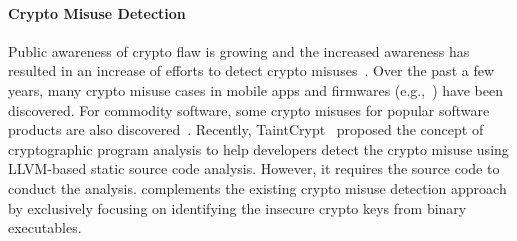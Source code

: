 \paragraph{Crypto Misuse Detection} 
Public awareness of crypto flaw is growing and the increased awareness has resulted in an increase of efforts to detect crypto misuses~\cite{lazar2014does, duong2011cryptography, li2014icryptotracer}. 
Over the past a few years, many crypto misuse cases in mobile apps and firmwares (e.g.,~\cite{egele2013empirical, costin2014large}) have been discovered. 
For commodity software,	some crypto misuses for popular software products are also discovered~\cite{wu2005misuse, duong2011cryptography, dodis2013security, everspaugh2014not}. 
{
Recently, TaintCrypt~\cite{rahaman2017program}  proposed the concept of cryptographic program analysis to help developers detect the crypto misuse using LLVM-based static source code analysis.
However, it requires the source code to conduct the analysis.
}
\sysname complements the existing crypto misuse detection approach by exclusively focusing on identifying the insecure crypto keys from binary executables. 



\def\semicheck{\checkmark\kern-1.1ex\raisebox{.7ex}{\rotatebox[origin=c]{125}{--}}}


\newcommand{\tickYes}{\ding{51}}
\newcommand{\tickNo}{\ding{55}}

